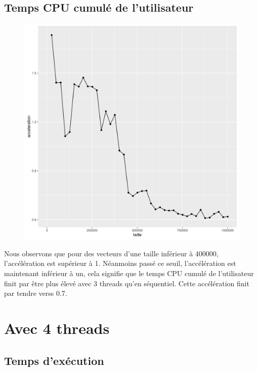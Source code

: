 \documentclass[a4paper,11pt]{scrartcl}
\begin{document}
\subsection{Temps CPU cumul\'e de l'utilisateur}
\begin{figure}[H] \center
   \includegraphics[scale=0.5] {graphes/temps_user_accel3.png}
\end{figure}
Nous observons que pour des vecteurs d'une taille inf\'erieur \`a 400000, l'acc\'el\'eration est sup\'erieur \`a 1. N\'eanmoins pass\'e ce seuil,  l'acc\'el\'eration est maintenant inf\'erieur \`a un, cela signifie que le temps CPU cumul\'e de l'utilisateur finit par \^{e}tre plus \'elev\'e avec 3 threads qu'en s\'equentiel. Cette acc\'el\'eration finit par tendre verss 0.7.


\section{Avec 4 threads}
\subsection{Temps d'ex\'ecution}
\end{document}
